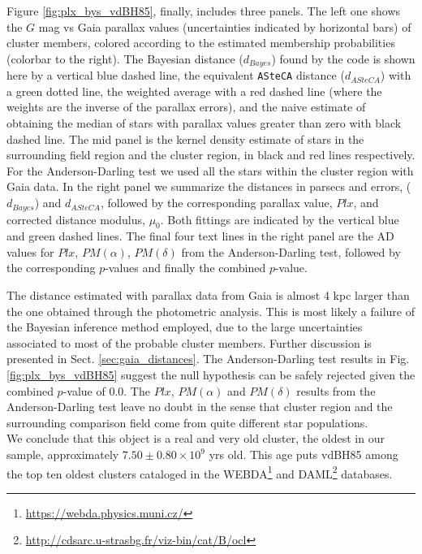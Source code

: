 \documentclass[draft]{aa}
\begin{document}
Figure \ref{fig:plx_bys_vdBH85}, finally, includes three panels. The
left one shows the $G$ mag vs Gaia parallax values (uncertainties indicated by
horizontal bars) of cluster members, colored according to the estimated
membership probabilities (colorbar to the right).
%
The Bayesian distance ($d_{Bayes}$) found by the code is shown here by
a vertical blue dashed line, the equivalent \texttt{ASteCA} distance
($d_{ASteCA}$) with a green dotted line, the weighted average with a red dashed
line (where the weights are the inverse of the parallax
errors), and the naive estimate of obtaining the median of stars with
parallax values greater than zero with black dashed line.
%
The mid panel is the kernel density estimate of stars in the surrounding
field region and the cluster region, in black and red lines respectively. For
the Anderson-Darling test we used all the stars within the cluster region with
Gaia data. In the right panel we summarize the distances in parsecs and errors,
($d_{Bayes}$) and $d_{ASteCA}$, followed by the corresponding parallax
value, $Plx$, and corrected distance modulus, $\mu_0$. Both fittings are
indicated by the vertical blue and green dashed lines. The final
four text lines in the right panel are the AD values for $Plx$, $PM(\alpha)$,
$PM(\delta)$ from the Anderson-Darling test, followed by the corresponding
$p$-values and finally the combined $p$-value.

The distance estimated with parallax data from Gaia is almost 4 kpc
larger than the one obtained through the photometric analysis. This is most
likely a failure of the Bayesian inference method employed, due to the large
uncertainties associated to most of the probable cluster members. Further
discussion is presented in Sect. \ref{sec:gaia_distances}.
%
The Anderson-Darling test results in Fig. \ref{fig:plx_bys_vdBH85} suggest the
null hypothesis can be safely rejected given the combined $p$-value of
0.0. The $Plx$, $PM(\alpha)$ and $PM(\delta)$ results from the
Anderson-Darling test leave no doubt in the sense that cluster region and the
surrounding comparison field come from quite different star populations.\\

We conclude that this object is a real and very old cluster, the oldest in our
sample, approximately $7.50\pm0.80\times10^9$ yrs old. This age puts
vdBH85 among the top ten oldest clusters cataloged in the
WEBDA\footnote{\url{https://webda.physics.muni.cz/}} and
DAML\footnote{\url{http://cdsarc.u-strasbg.fr/viz-bin/cat/B/ocl}}
\citep{Dias_2002} databases.
\end{document}
